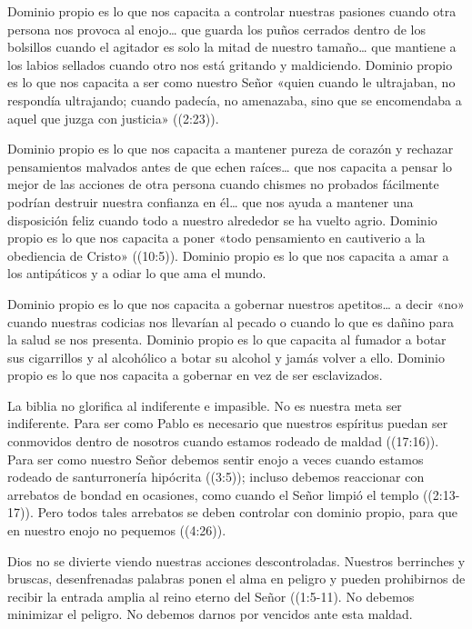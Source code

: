 \documentclass[12pt, twoside, openright]{book}
\begin{document}
Dominio propio es lo que nos capacita a controlar nuestras pasiones cuando otra persona nos provoca al enojo… que guarda los puños cerrados dentro de los bolsillos cuando el agitador es solo la mitad de nuestro tamaño… que mantiene a los labios sellados cuando otro nos está gritando y maldiciendo. Dominio propio es lo que nos capacita a ser como nuestro Señor «quien cuando le ultrajaban, no respondía ultrajando; cuando padecía, no amenazaba, sino que se encomendaba a aquel que juzga con justicia» ((2:23)).  

Dominio propio es lo que nos capacita a mantener pureza de corazón y rechazar pensamientos malvados antes de que echen raíces… que nos capacita a pensar lo mejor de las acciones de otra persona cuando chismes no probados fácilmente podrían destruir nuestra confianza en él… que nos ayuda a mantener una disposición feliz cuando todo a nuestro alrededor se ha vuelto agrio. Dominio propio es lo que nos capacita a poner «todo pensamiento en cautiverio a la obediencia de Cristo» ((10:5)). Dominio propio es lo que nos capacita a amar a los antipáticos y a odiar lo que ama el mundo. 

Dominio propio es lo que nos capacita a gobernar nuestros apetitos… a decir «no» cuando nuestras codicias nos llevarían al pecado o cuando lo que es dañino para la salud se nos presenta. Dominio propio es lo que capacita al fumador a botar sus cigarrillos y al alcohólico a botar su alcohol y jamás volver a ello. Dominio propio es lo que nos capacita a gobernar en vez de ser esclavizados. 

La biblia no glorifica al indiferente e impasible. No es nuestra meta ser indiferente. Para ser como Pablo es necesario que nuestros espíritus puedan ser conmovidos dentro de nosotros cuando estamos rodeado de maldad ((17:16)). Para ser como nuestro Señor debemos sentir enojo a veces cuando estamos rodeado de santurronería hipócrita ((3:5)); incluso debemos reaccionar con arrebatos de bondad en ocasiones, como cuando el Señor limpió el templo ((2:13-17)). Pero todos tales arrebatos se deben controlar con dominio propio, para que en nuestro enojo no pequemos ((4:26)).

Dios no se divierte viendo nuestras acciones descontroladas. Nuestros berrinches y bruscas, desenfrenadas palabras ponen el alma en peligro y pueden prohibirnos de recibir la entrada amplia al reino eterno del Señor ((1:5-11). No debemos minimizar el peligro. No debemos darnos por vencidos ante esta maldad. 
\end{document}
